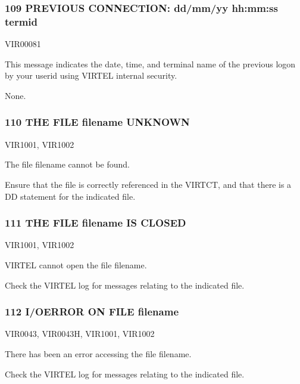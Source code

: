 \documentclass[letterpaper,10pt,english]{sphinxmanual}
\begin{document}
\subsubsection{109 PREVIOUS CONNECTION: dd/mm/yy hh:mm:ss termid}
\label{\detokenize{messages:previous-connection-dd-mm-yy-hh-mm-ss-termid}}\begin{description}
\sphinxAtStartPar
VIR00081

\sphinxAtStartPar
This message indicates the date, time, and terminal name of the previous logon by your userid using VIRTEL internal security.

\sphinxAtStartPar
None.

\end{description}


\subsubsection{110 THE FILE filename UNKNOWN}
\label{\detokenize{messages:the-file-filename-unknown}}\begin{description}
\sphinxAtStartPar
VIR1001, VIR1002

\sphinxAtStartPar
The file filename cannot be found.

\sphinxAtStartPar
Ensure that the file is correctly referenced in the VIRTCT, and that there is a DD statement for the indicated file.

\end{description}


\subsubsection{111 THE FILE filename IS CLOSED}
\label{\detokenize{messages:the-file-filename-is-closed}}\begin{description}
\sphinxAtStartPar
VIR1001, VIR1002

\sphinxAtStartPar
VIRTEL cannot open the file filename.

\sphinxAtStartPar
Check the VIRTEL log for messages relating to the indicated file.

\end{description}


\subsubsection{112 I/OERROR ON FILE filename}
\label{\detokenize{messages:i-oerror-on-file-filename}}\begin{description}
\sphinxAtStartPar
VIR0043, VIR0043H, VIR1001, VIR1002

\sphinxAtStartPar
There has been an error accessing the file filename.

\sphinxAtStartPar
Check the VIRTEL log for messages relating to the indicated file.

\end{description}
\end{document}
